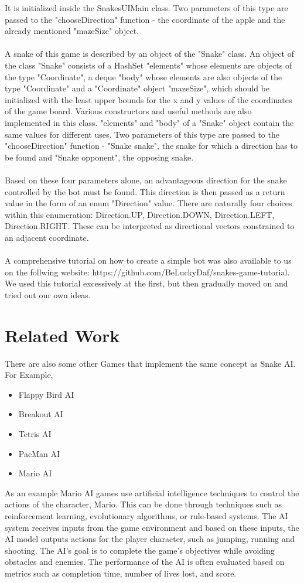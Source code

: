 \documentclass[a4paper,12pt]{article}
\begin{document}
It is initialized inside the SnakesUIMain class. Two parameters of this type are passed to 
the "chooseDirection" function - the coordinate of the apple and the already mentioned "mazeSize" object.\\
\\A snake of this game is described by an object of the "Snake" class. An object of the class "Snake"
consists of a HashSet "elements" whose elements are objects of the type "Coordinate", a deque "body"
whose elements are also objects of the type "Coordinate" and a "Coordinate" object "mazeSize", which 
should be initialized with the least upper bounds for the x and y values of the coordinates of the game
board. Various constructors and useful methods are also implemented in this class. "elements" and "body" 
of a "Snake" object contain the same values for different uses. Two parameters of this type are passed to 
the "chooseDirection" function - "Snake snake", the snake for which a direction has to be found and "Snake opponent", the opposing snake.\\
\\Based on these four parameters alone, an advantageous direction for the snake controlled by the bot 
must be found. This direction is then passed as a return value in the form of an enum "Direction" value. 
There are naturally four choices within this enumeration: Direction.UP, Direction.DOWN, Direction.LEFT,
Direction.RIGHT. These can be interpreted as directional vectors constrained to an adjacent coordinate.\\
\\A comprehensive tutorial on how to create a simple bot was also available to us on the follwing website: 
https://github.com/BeLuckyDaf/snakes-game-tutorial. We used this tutorial excessively at the first, but then 
gradually moved on and tried out our own ideas.

\section{Related Work}
There are also some other Games that implement the same concept as Snake AI. For Example,
\begin{itemize}
\item Flappy Bird AI
\item Breakout AI
\item Tetris AI
\item PacMan AI
\item Mario AI
\end{itemize}
As an example Mario AI games use artificial intelligence techniques to control the actions of the character,
Mario. This can be done through techniques such as reinforcement learning, evolutionary algorithms,
or rule-based systems. The AI system receives inputs from the game environment and based on these inputs,
the AI model outputs actions for the player character, such as jumping, running and shooting.
The AI's goal is to complete the game's objectives while avoiding obstacles and enemies.
The performance of the AI is often evaluated based on metrics such as completion time, number of lives lost, and score.
\end{document}
